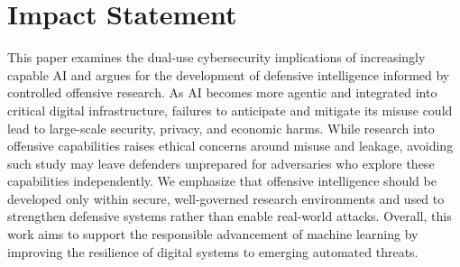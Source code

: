 \documentclass{article}
\theoremstyle{plain}
\theoremstyle{definition}
\theoremstyle{remark}
\begin{document}
\section*{Impact Statement}

This paper examines the dual-use cybersecurity implications of increasingly capable AI and argues for the development of defensive intelligence informed by controlled offensive research. As AI becomes more agentic and integrated into critical digital infrastructure, failures to anticipate and mitigate its misuse could lead to large-scale security, privacy, and economic harms. While research into offensive capabilities raises ethical concerns around misuse and leakage, avoiding such study may leave defenders unprepared for adversaries who explore these capabilities independently. We emphasize that offensive intelligence should be developed only within secure, well-governed research environments and used to strengthen defensive systems rather than enable real-world attacks. Overall, this work aims to support the responsible advancement of machine learning by improving the resilience of digital systems to emerging automated threats.



\nocite{langley00}



\end{document}
